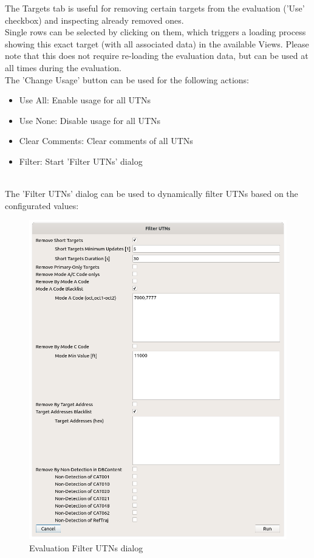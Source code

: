 The Targets tab is useful for removing certain targets from the evaluation ('Use' checkbox) and inspecting already removed ones. \\

Single rows can be selected by clicking on them, which triggers a loading process showing this exact target (with all associated data) in the available Views. Please note that this does not require re-loading the evaluation data, but can be used at all times during the evaluation. \\

The 'Change Usage' button can be used for the following actions:
\begin{itemize}  
\item Use All: Enable usage for all UTNs
\item Use None: Disable usage for all UTNs
\item Clear Comments: Clear comments of all UTNs
\item Filter: Start 'Filter UTNs' dialog
\end{itemize}
\ \\

The 'Filter UTNs' dialog can be used to dynamically filter UTNs based on the configurated values:

\begin{figure}[H]
    \includegraphics[width=15cm]{figures/eval_filter_utns.png}
  \caption{Evaluation Filter UTNs dialog}
\end{figure}

